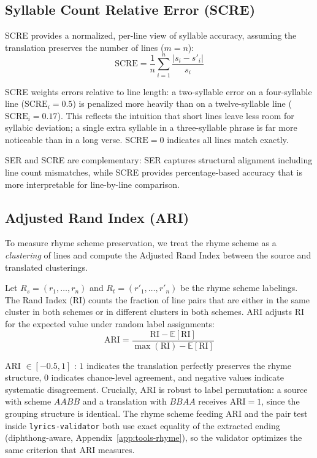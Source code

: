 \documentclass[11pt]{article}
\begin{document}
\subsection{Syllable Count Relative Error (SCRE)}

SCRE provides a normalized, per-line view of syllable accuracy, assuming the translation preserves the number of lines ($m = n$):
\begin{equation}
    \text{SCRE} = \frac{1}{n} \sum_{i=1}^{n} \frac{|s_i - s'_i|}{s_i}
\end{equation}

SCRE weights errors relative to line length: a two-syllable error on a four-syllable line ($\text{SCRE}_i = 0.5$) is penalized more heavily than on a twelve-syllable line ($\text{SCRE}_i = 0.17$).
This reflects the intuition that short lines leave less room for syllabic deviation; a single extra syllable in a three-syllable phrase is far more noticeable than in a long verse.
$\text{SCRE} = 0$ indicates all lines match exactly.

SER and SCRE are complementary: SER captures structural alignment including line count mismatches, while SCRE provides percentage-based accuracy that is more interpretable for line-by-line comparison.

\subsection{Adjusted Rand Index (ARI)}

To measure rhyme scheme preservation, we treat the rhyme scheme as a \emph{clustering} of lines and compute the Adjusted Rand Index \citep{hubert-arabie-1985} between the source and translated clusterings.

Let $R_s = (r_1, \ldots, r_n)$ and $R_t = (r'_1, \ldots, r'_n)$ be the rhyme scheme labelings.
The Rand Index (RI) counts the fraction of line pairs that are either in the same cluster in both schemes or in different clusters in both schemes.
ARI adjusts RI for the expected value under random label assignments:
\begin{equation}
    \text{ARI} = \frac{\text{RI} - \mathbb{E}[\text{RI}]}{\max(\text{RI}) - \mathbb{E}[\text{RI}]}
\end{equation}

ARI $\in [-0.5, 1]$ \citep{pedregosa-etal-2011-scikit}: $1$ indicates the translation perfectly preserves the rhyme structure, $0$ indicates chance-level agreement, and negative values indicate systematic disagreement.
Crucially, ARI is robust to label permutation: a source with scheme $AABB$ and a translation with $BBAA$ receives $\text{ARI} = 1$, since the grouping structure is identical.
The rhyme scheme feeding ARI and the pair test inside \texttt{lyrics-validator} both use exact equality of the extracted ending (diphthong-aware, Appendix~\ref{app:tools-rhyme}), so the validator optimizes the same criterion that ARI measures.
\end{document}
